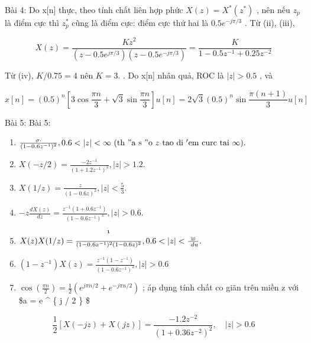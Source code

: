 \documentclass[
  10
]{article}
\begin{document}
Bài 4: Do x{[}n{]} thực, theo tính chất liên hợp phức
\(X ( z ) = X ^ { \ast } ( z ^ { \ast } )\) , nên nếu \(z _ { p }\) là
điểm cực thì \(z _ { p } ^ { * }\) cũng là điểm cực: điểm cực thứ hai là
\(0 . 5 e ^ { - j \pi / 3 }\) . Từ (ii), (iii),

\[
X (z) = \frac {K z ^ {2}}{(z - 0 . 5 e ^ {j \pi / 3}) (z - 0 . 5 e ^ {- j \pi / 3})} = \frac {K}{1 - 0 . 5 z ^ {- 1} + 0 . 2 5 z ^ {- 2}}
\]

Từ (iv), \(K / 0 . 7 5 = 4\) nên \(K = 3 .\) . Do x{[}n{]} nhân quả, ROC
là \(| z | > 0 . 5\) , và

\[
x [ n ] = (0. 5) ^ {n} \left[ 3 \cos {\frac {\pi n}{3}} + \sqrt {3} \sin {\frac {\pi n}{3}} \right] u [ n ] = 2 \sqrt {3} (0. 5) ^ {n} \sin {\frac {\pi (n + 1)}{3}} u [ n ]
\]

Bài 5: Bài 5:

\begin{enumerate}
\def\labelenumi{(\alph{enumi})}
\item
  \({ \frac { \sigma \cdot } { ( 1 - 0 . 6 z ^ { - 1 } ) ^ { 2 } } } , 0 . 6 < | z | < \infty { \mathrm { ~ ( t h \ " a ~ s \ " o ~ } } z { \mathrm { ~ t a o ~ d i \ ' e m ~ c u r c ~ t a i ~ \infty ) . } }\)
\item
  \(X ( - z / 2 ) = { \frac { - 2 z ^ { - 1 } } { ( 1 + 1 . 2 z ^ { - 1 } ) ^ { 2 } } } , | z | > 1 . 2 .\)
\item
  \(X ( 1 / z ) = \frac { z } { ( 1 - 0 . 6 z ) ^ { 2 } } , | z | < \frac { 5 } { 3 } .\)
\item
  \(- z \frac { d X ( z ) } { d z } = \frac { z ^ { - 1 } ( 1 + 0 . 6 z ^ { - 1 } ) } { ( 1 - 0 . 6 z ^ { - 1 } ) ^ { 3 } } , | z | > 0 . 6 .\)
\item
  \(X ( z ) X ( 1 / z ) = \frac { \strut ^ { \mathbf { 1 } } } { ( 1 - 0 . 6 z ^ { - 1 } ) ^ { 2 } ( 1 - 0 . 6 z ) ^ { 2 } } , 0 . 6 < | z | < \frac { \uplus } { \ d u } .\)
\item
  \(( 1 - z ^ { - 1 } ) X ( z ) = \frac { z ^ { - 1 } ( 1 - z ^ { - 1 } ) } { ( 1 - 0 . 6 z ^ { - 1 } ) ^ { 2 } } , | z | > 0 . 6\)
\item
  \(\cos \left( { \textstyle { \frac { \pi n } { 2 } } } \right) = { \textstyle { \frac { 1 } { 2 } } } { \textstyle \left( e ^ { j \pi { \dot { n } } / 2 } + e ^ { - j \pi n / 2 } \right) }\)
  ; áp dụng tính chất co giãn trên miền z với \$a = e \^{} \{ \pm j
  \pi / 2 \} \$
\end{enumerate}

\[
\frac {1}{2} \left[ X (- j z) + X (j z) \right] = \frac {- 1 . 2 z ^ {- 2}}{(1 + 0 . 3 6 z ^ {- 2}) ^ {2}}, \quad | z | > 0. 6
\]
\end{document}

